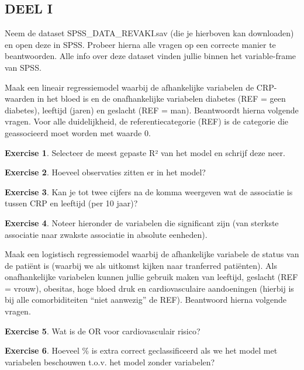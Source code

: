 \documentclass[
]{book}
\theoremstyle{definition}
\theoremstyle{definition}
\theoremstyle{definition}
\newtheorem{exercise}{Exercise}[chapter]
\theoremstyle{definition}
\theoremstyle{remark}
\begin{document}
\hypertarget{deel-i}{%
\subsection*{DEEL I}\label{deel-i}}


Neem de dataset SPSS\_DATA\_REVAKI.sav (die je hierboven kan downloaden) en open deze in SPSS. Probeer hierna alle vragen op een correcte manier te beantwoorden. Alle info over deze dataset vinden jullie binnen het variable-frame van SPSS.

Maak een lineair regressiemodel waarbij de afhankelijke variabelen de CRP-waarden in het bloed is en de onafhankelijke variabelen diabetes (REF = geen diabetes), leeftijd (jaren) en geslacht (REF = man). Beantwoordt hierna volgende vragen. Voor alle duidelijkheid, de referentiecategorie (REF) is de categorie die geassocieerd moet worden met waarde 0.

\begin{exercise}
Selecteer de meest gepaste R² van het model en schrijf deze neer.
\end{exercise}

\begin{exercise}
Hoeveel observaties zitten er in het model?
\end{exercise}

\begin{exercise}
Kan je tot twee cijfers na de komma weergeven wat de associatie is tussen CRP en leeftijd (per 10 jaar)?
\end{exercise}

\begin{exercise}
Noteer hieronder de variabelen die significant zijn (van sterkste associatie naar zwakste associatie in absolute eenheden).
\end{exercise}

Maak een logistisch regressiemodel waarbij de afhankelijke variabele de status van de patiënt is (waarbij we als uitkomst kijken naar tranferred patiënten). Als onafhankelijke variabelen kunnen jullie gebruik maken van leeftijd, geslacht (REF = vrouw), obesitas, hoge bloed druk en cardiovasculaire aandoeningen (hierbij is bij alle comorbiditeiten ``niet aanwezig'' de REF). Beantwoord hierna volgende vragen.

\begin{exercise}
Wat is de OR voor cardiovasculair risico?
\end{exercise}

\begin{exercise}
Hoeveel \% is extra correct geclassificeerd als we het model met variabelen beschouwen t.o.v. het model zonder variabelen?
\end{exercise}
\end{document}
